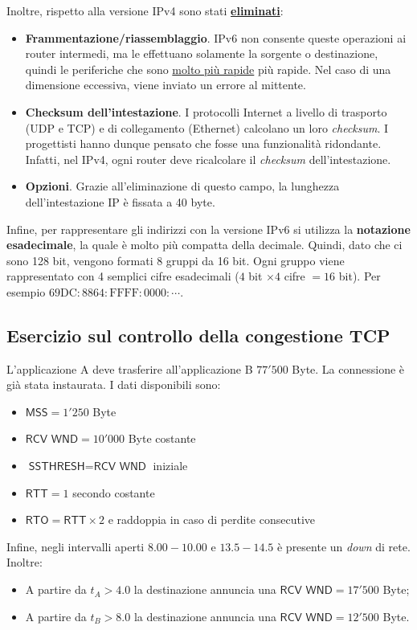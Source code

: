\documentclass[a4paper]{article}
\begin{document}
	Inoltre, rispetto alla versione IPv4 sono stati \textbf{\underline{eliminati}}:
	\begin{itemize}[label=]
		\item \textbf{Frammentazione/riassemblaggio}. IPv6 non consente queste operazioni ai router intermedi, ma le effettuano solamente la sorgente o destinazione, quindi le periferiche che sono \underline{molto più rapide} più rapide. Nel caso di una dimensione eccessiva, viene inviato un errore al mittente.
		
		\item \textbf{Checksum dell’intestazione}. I protocolli Internet a livello di trasporto (\textsf{UDP} e \textsf{TCP}) e di collegamento (Ethernet) calcolano un loro \emph{checksum}. I progettisti hanno dunque pensato che fosse una funzionalità ridondante. Infatti, nel IPv4, ogni router deve ricalcolare il \emph{checksum} dell’intestazione.
		
		\item \textbf{Opzioni}. Grazie all’eliminazione di questo campo, la lunghezza dell’intestazione IP è fissata a 40 byte.
	\end{itemize}
	Infine, per rappresentare gli indirizzi con la versione IPv6 si utilizza la \textbf{notazione esadecimale}, la quale è molto più compatta della decimale. Quindi, dato che ci sono 128 bit, vengono formati 8 gruppi da 16 bit. Ogni gruppo viene rappresentato con 4 semplici cifre esadecimali ($4$ bit $\times 4$ cifre $ = 16$ bit). Per esempio $69\mathrm{DC} : 8864 : \mathrm{FFFF} : 0000 : \cdots$.\newpage
	
	\subsection{\textcolor{Red3}{Esercizio sul controllo della congestione TCP}}
	
	L’applicazione A deve trasferire all'applicazione B $77'500$ Byte. La connessione è già stata instaurata. I dati disponibili sono:
	\begin{itemize}
		\item $\textsf{MSS} = 1'250$ Byte
		\item $\textsf{RCV WND} = 10'000$ Byte costante
		\item $\textsf{SSTHRESH} = \textsf{RCV WND}$ iniziale
		\item $\textsf{RTT} = 1$ secondo costante
		\item $\textsf{RTO} = \textsf{RTT} \times 2$ e raddoppia in caso di perdite consecutive
	\end{itemize}
	Infine, negli intervalli aperti $8.00 - 10.00$ e $13.5 - 14.5$ è presente un \emph{down} di rete. Inoltre:
	\begin{itemize}
		\item A partire da $t_{A} > 4.0$ la destinazione annuncia una $\textsf{RCV WND} = 17'500$ Byte;
		\item A partire da $t_{B} > 8.0$ la destinazione annuncia una $\textsf{RCV WND} = 12'500$ Byte.
	\end{itemize}
	
\end{document}
